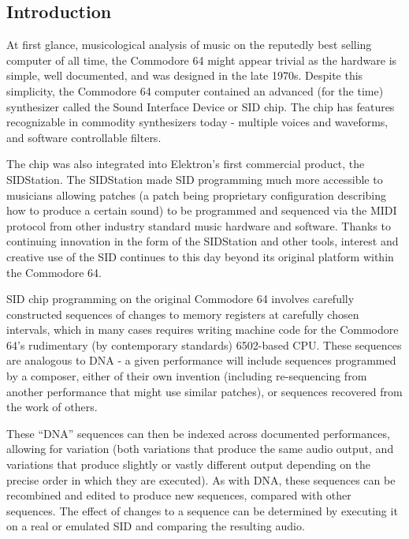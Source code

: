 \documentclass[10pt]{article}
\begin{document}
\begin{multicols*}{2}

  \section{Introduction}

  At first glance, musicological analysis of music on the reputedly best selling computer of all time, the Commodore 64\cite{ieeec64} might appear trivial as the hardware is simple, well documented, and was designed in the late 1970s. Despite this simplicity, the Commodore 64 computer contained an advanced (for the time) synthesizer called the Sound Interface Device\cite{sidpatent} or SID chip. The chip has features recognizable in commodity synthesizers today - multiple voices and waveforms, and software controllable filters.

  The chip was also integrated into Elektron’s first commercial product, the SIDStation\cite{sidstation}.  The SIDStation made SID programming much more accessible to musicians allowing patches (a patch being proprietary configuration describing how to produce a certain sound) to be programmed and sequenced via the MIDI protocol from other industry standard music hardware and software. Thanks to continuing innovation in the form of the SIDStation and other tools, interest and creative use of the SID continues to this day beyond its original platform within the Commodore 64.

SID chip programming on the original Commodore 64 involves carefully constructed sequences of changes to memory registers at carefully chosen intervals, which in many cases requires writing machine code for the Commodore 64's rudimentary (by contemporary standards) 6502-based CPU. These sequences are analogous to DNA - a given performance will include sequences programmed by a composer, either of their own invention (including re-sequencing from another performance that might use similar patches), or sequences recovered from the work of others.

These “DNA” sequences can then be indexed across documented performances, allowing for variation (both variations that produce the same audio output, and variations that produce slightly or vastly different output depending on the precise order in which they are executed). As with DNA, these sequences can be recombined and edited to produce new sequences, compared with other sequences. The effect of changes to a sequence can be determined by executing it on a real or emulated SID and comparing the resulting audio.


\end{multicols*}
\end{document}
